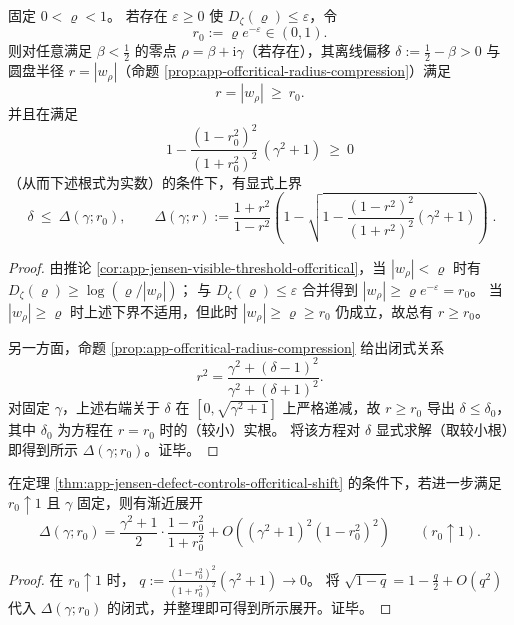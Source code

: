 \begin{theorem}[缺陷上界推出离线偏移的显式上界]\label{thm:app-jensen-defect-controls-offcritical-shift}
固定 \(0<\varrho<1\)。
若存在 \(\varepsilon\ge 0\) 使 \(D_{\zeta}(\varrho)\le \varepsilon\)，令
\[
r_0:=\varrho e^{-\varepsilon}\in(0,1).
\]
则对任意满足 \(\beta<\tfrac12\) 的零点 \(\rho=\beta+\mathrm{i}\gamma\)（若存在），其离线偏移 \(\delta:=\tfrac12-\beta>0\) 与圆盘半径 \(r=|w_{\rho}|\)（命题 \ref{prop:app-offcritical-radius-compression}）满足
\[
r=|w_{\rho}|\ \ge\ r_0.
\]
并且在满足
\[
1-\frac{(1-r_0^2)^2}{(1+r_0^2)^2}\,(\gamma^2+1)\ \ge\ 0
\]
（从而下述根式为实数）的条件下，有显式上界
\[
\boxed{\;
\delta\ \le\ \Delta(\gamma;r_0),\qquad
\Delta(\gamma;r)
:=\frac{1+r^{2}}{1-r^{2}}
\left(1-\sqrt{1-\frac{(1-r^{2})^{2}}{(1+r^{2})^{2}}(\gamma^{2}+1)}\right)\; }.
\]
\end{theorem}

\begin{proof}
由推论 \ref{cor:app-jensen-visible-threshold-offcritical}，当 \(|w_{\rho}|<\varrho\) 时有
\(
D_{\zeta}(\varrho)\ge \log(\varrho/|w_{\rho}|)
\)；
与 \(D_{\zeta}(\varrho)\le \varepsilon\) 合并得到 \(|w_{\rho}|\ge \varrho e^{-\varepsilon}=r_0\)。
当 \(|w_{\rho}|\ge \varrho\) 时上述下界不适用，但此时 \(|w_{\rho}|\ge \varrho\ge r_0\) 仍成立，故总有 \(r\ge r_0\)。
\par
另一方面，命题 \ref{prop:app-offcritical-radius-compression} 给出闭式关系
\[
r^{2}=\frac{\gamma^{2}+(\delta-1)^{2}}{\gamma^{2}+(\delta+1)^{2}}.
\]
对固定 \(\gamma\)，上述右端关于 \(\delta\) 在 \([0,\sqrt{\gamma^{2}+1}]\) 上严格递减，故 \(r\ge r_0\) 导出 \(\delta\le \delta_0\)，其中 \(\delta_0\) 为方程在 \(r=r_0\) 时的（较小）实根。
将该方程对 \(\delta\) 显式求解（取较小根）即得到所示 \(\Delta(\gamma;r_0)\)。证毕。
\end{proof}

\begin{corollary}\label{cor:app-jensen-offcritical-shift-boundary}
在定理 \ref{thm:app-jensen-defect-controls-offcritical-shift} 的条件下，若进一步满足 \(r_0\uparrow 1\) 且 \(\gamma\) 固定，则有渐近展开
\[
\Delta(\gamma;r_0)
=\frac{\gamma^2+1}{2}\cdot\frac{1-r_0^2}{1+r_0^2}
+O\!\left((\gamma^2+1)^2(1-r_0^2)^2\right)
\qquad(r_0\uparrow 1).
\]
\end{corollary}

\begin{proof}
在 \(r_0\uparrow 1\) 时，
\(
q:=\frac{(1-r_0^2)^2}{(1+r_0^2)^2}(\gamma^2+1)\to 0
\)。
将
\(
\sqrt{1-q}=1-\frac{q}{2}+O(q^2)
\)
代入 \(\Delta(\gamma;r_0)\) 的闭式，并整理即可得到所示展开。证毕。
\end{proof}

\endinput
